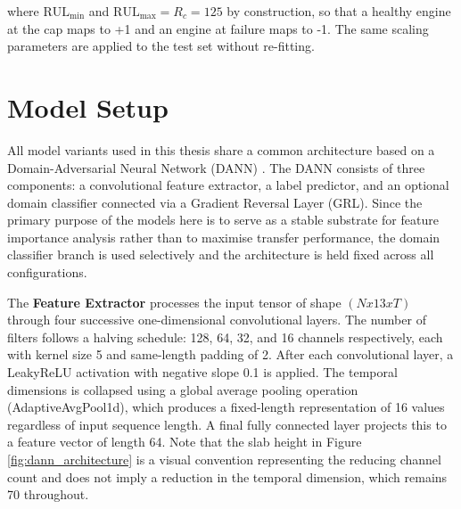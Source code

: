 where $\text{RUL}_{\text{min}}$ and $\text{RUL}_{\text{max}} = R_c = \text{125}$ by construction, so that a healthy engine at the cap maps to +1 and an engine at failure maps to -1. The same scaling parameters are applied to the test set without re-fitting.





\section{Model Setup}
All model variants used in this thesis share a common architecture based on a Domain-Adversarial Neural Network (DANN) \cite{}. The DANN consists of three components: a convolutional feature extractor, a label predictor, and an optional domain classifier connected via a Gradient Reversal Layer (GRL). Since the primary purpose of the models here is to serve as a stable substrate for feature importance analysis rather than to maximise transfer performance, the domain classifier branch is used selectively and the architecture is held fixed across all configurations.

The \textbf{Feature Extractor} processes the input tensor of shape $(N x 13 x T)$ through four successive one-dimensional convolutional layers. The number of filters follows a halving schedule: 128, 64, 32, and 16 channels respectively, each with kernel size 5 and same-length padding of 2. After each convolutional layer, a LeakyReLU activation with negative slope 0.1 is applied. The temporal dimensions is collapsed using a global average pooling operation (AdaptiveAvgPool1d), which produces a fixed-length representation of 16 values regardless of input sequence length. A final fully connected layer projects this to a feature vector of length 64. Note that the slab height in Figure \ref{fig:dann_architecture} is a visual convention representing the reducing channel count and does not imply a reduction in the temporal dimension, which remains 70 throughout.

